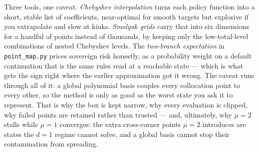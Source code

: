 \documentclass[11pt]{article}
\newcommand{\code}[1]{\texttt{#1}}
\begin{document}
Three tools, one caveat. \emph{Chebyshev interpolation} turns each policy
function into a short, stable list of coefficients, near-optimal for smooth
targets but explosive if you extrapolate and slow at kinks.
\emph{Smolyak grids} carry that into six dimensions for a handful of points
instead of thousands, by keeping only the low-total-level combinations of
nested Chebyshev levels. The \emph{two-branch expectation} in
\code{point\_map.py} prices sovereign risk honestly, as a probability weight
on a default continuation that is the same rules read at a reachable state
--- which is what gets the sign right where the earlier approximation got it
wrong. The caveat runs through all of it: a global polynomial basis couples
every collocation point to every other, so the method is only as good as the
worst state you ask it to represent. That is why the box is kept narrow, why
every evaluation is clipped, why failed points are retained rather than
trusted --- and, ultimately, why $\mu=2$ stalls while $\mu=1$ converges: the
extra cross-corner points $\mu=2$ introduces are states the $d=1$ regime
cannot solve, and a global basis cannot stop their contamination from
spreading.
\end{document}
